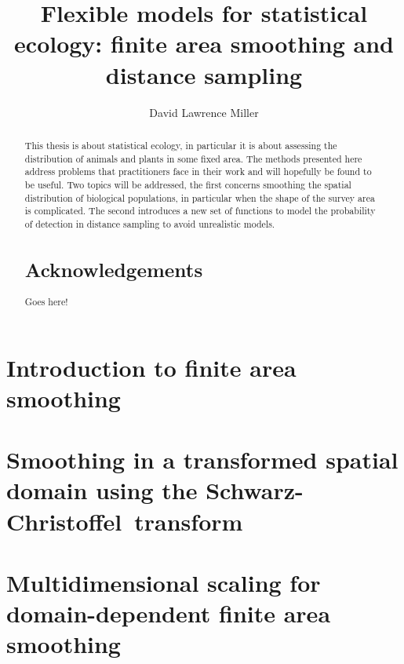 \documentclass[12pt]{report}
\title{Flexible models for statistical ecology: finite area smoothing and distance sampling}
\author{David Lawrence Miller}
\newcommand{\sch}{Schwarz-Christoffel}
\begin{document}
\maketitle
\begin{abstract} 
This thesis is about statistical ecology, in particular it is about assessing the distribution of animals and plants in some fixed area. The methods presented here address problems that practitioners face in their work and will hopefully be found to be useful. Two topics will be addressed, the first concerns smoothing the spatial distribution of biological populations, in particular when the shape of the survey area is complicated. The second introduces a new set of functions to model the probability of detection in distance sampling to avoid unrealistic models.

\begin{center}
\section*{Acknowledgements}
\end{center}
Goes here!
\end{abstract}



\tableofcontents

\listoffigures

\listoftables

\chapter{Introduction to finite area smoothing}
%



\chapter{Smoothing in a transformed spatial domain using the \sch\ transform}
%



\chapter{Multidimensional scaling for domain-dependent finite area smoothing}
\end{document}
